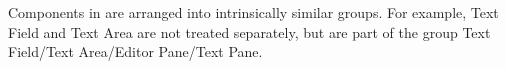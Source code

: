 \item[Concrete Component Group]{Components in \jb{}are arranged into intrinsically similar groups. For example, Text Field and Text Area are not treated separately, 
but are part of the group Text Field/Text Area/Editor Pane/Text Pane.
}
